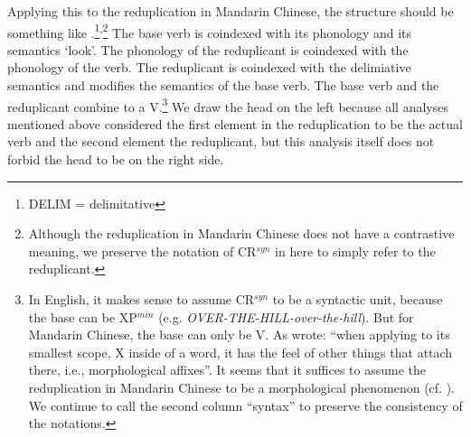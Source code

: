 Applying this to the reduplication in Mandarin Chinese, the structure should be something like .\footnote{{DELIM} = delimitative}\textsuperscript{,}\footnote{
Although the reduplication in Mandarin Chinese does not have a contrastive meaning, 
we preserve the notation of CR$^{syn}$ in \citet{Ghomeshietal2004} here to simply refer to the reduplicant.}
The base verb is coindexed with its phonology and its semantics `look'. 
The phonology of the reduplicant is coindexed with the phonology of the verb.
The reduplicant is coindexed with the delimiative semantics
and modifies the semantics of the base verb.
The base verb and the reduplicant combine to a V.\footnote{In English, it makes sense to assume CR$^{syn}$ to be a syntactic unit, because the base can be XP$^{min}$ (e.g. \textit{OVER-THE-HILL-over-the-hill}). 
But for Mandarin Chinese, the base can only be V.
As \citet[353]{Ghomeshietal2004} wrote: ``when applying to its smallest scope, X inside of a word, it has the feel of other things that attach there, i.e., morphological affixes''.
It seems that it suffices to assume the reduplication in Mandarin Chinese to be a morphological phenomenon (cf. ).
We continue to call the second column ``syntax'' to preserve the consistency of the notations.
}
We draw the head on the left because all analyses mentioned above considered the first element in the reduplication to be the actual verb and the second element the reduplicant, 
but this analysis itself does not forbid the head to be on the right side.

